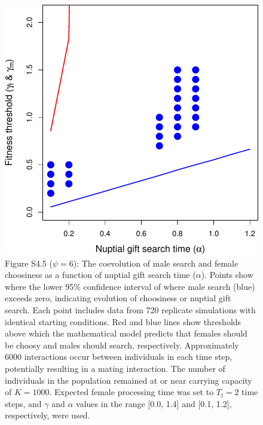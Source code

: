 \documentclass[
]{article}
\begin{document}
\captionsetup{labelformat=default}

\captionsetup{labelformat=empty}

\begin{figure}
\centering
\includegraphics{ms_refs_fixed_files/figure-latex/unnamed-chunk-10-1.pdf}
\caption{Figure S4.5 (\(\psi = 6\)): The coevolution of male search and
female choosiness as a function of nuptial gift search time
(\(\alpha\)). Points show where the lower 95\% confidence interval of
where male search (blue) exceeds zero, indicating evolution of
choosiness or nuptial gift search. Each point includes data from 720
replicate simulations with identical starting conditions. Red and blue
lines show thresholds above which the mathematical model predicts that
females should be choosy and males should search, respectively.
Approximately 6000 interactions occur between individuals in each time
step, potentially resulting in a mating interaction. The number of
individuals in the population remained at or near carrying capacity of
\(K = 1000\). Expected female processing time was set to
\(T_{\mathrm{f}}=2\) time steps, and \(\gamma\) and \(\alpha\) values in
the range {[}0.0, 1.4{]} and {[}0.1, 1.2{]}, respectively, were used.}
\end{figure}

\captionsetup{labelformat=default}
\end{document}
